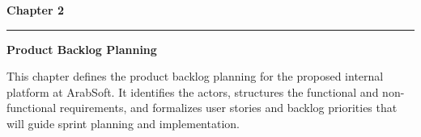   \newpage

  \fancyhead[R]{}
  \fancyfoot[C]{\thepage}
  \pagestyle{fancy}

  \thispagestyle{plain}


  \begin{center}
    {\fontsize{20}{24}\selectfont \textbf{Chapter 2}}
  \end{center}

  \noindent\rule{\textwidth}{0.4pt}

  \vspace{0.3cm}

  \begin{center}
    {\fontsize{20}{24}\selectfont \textbf{Product Backlog Planning}}
  \end{center}

  \vspace{0.6cm}


  {\fontsize{12}{16}\selectfont
  \setlength{\parindent}{1.2cm}
  \setlength{\parskip}{6pt}

  \indent This chapter defines the product backlog planning for the proposed internal platform at ArabSoft. It identifies the actors, structures the functional and non-functional requirements, and formalizes user stories and backlog priorities that will guide sprint planning and implementation.

  }

  \vspace{6pt}


